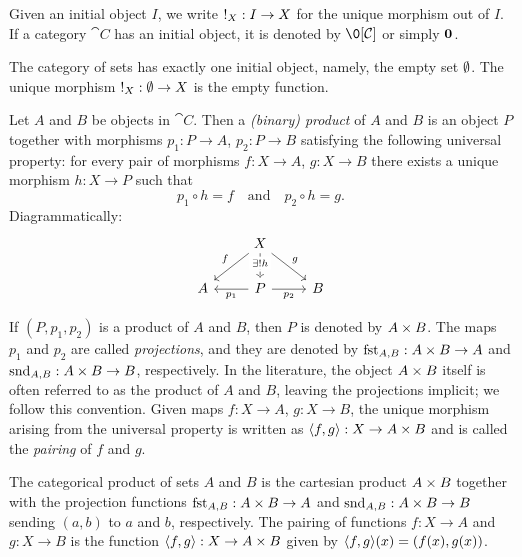 Given an initial object $I$, we write $\minit[X] : I \to X$ for the unique morphism out of $I$. If a category $\cat{C}$ has an initial object, it is denoted by $\0[\cat{C}]$ or simply $\mathbf{0}_{}$.

\begin{ex} \label{ex:set-initial-object}
The category of sets has exactly one initial object, namely, the empty set $\emptyset$. The unique morphism $\minit[X] : \nul \to X$ is the empty function.
\end{ex}

\begin{defn} \label{def:binary-products}
Let $A$ and $B$ be objects in $\cat{C}$. Then a \emph{(binary) product} of $A$ and $B$ is an object $P$ together with morphisms $p_1 : P \to A$, $p_2 : P \to B$ satisfying the following universal property: for every pair of morphisms $f : X \to A$, $g : X \to B$ there exists a unique morphism $h : X \to P$ such that 
\[ p_1 \circ h = f \quad\text{and}\quad p_2 \circ h = g. \]
Diagrammatically:
\[\begin{tikzcd}
	& X \\
	A & P & B
	\arrow["{p_1}", from=2-2, to=2-1]
	\arrow["{p_2}"', from=2-2, to=2-3]
	\arrow["f"', from=1-2, to=2-1]
	\arrow["g", from=1-2, to=2-3]
	\arrow["{\exists! h}"{description, pos=0.4}, dashed, from=1-2, to=2-2]
\end{tikzcd}\]
\end{defn}

If $(P, p_1, p_2)$ is a product of $A$ and $B$, then $P$ is denoted by $A \times B$. The maps $p_1$ and $p_2$ are called \emph{projections}, and they are denoted by $\mfst[A,B] : \cprod{A}{B} \to A$ and $\msnd[A,B] : \cprod{A}{B} \to B$, respectively. In the literature, the object $A \times B$ itself is often referred to as the product of $A$ and $B$, leaving the projections implicit; we follow this convention. Given maps $f : X \to A$, $g : X \to B$, the unique morphism arising from the universal property is written as $\langle f, g \rangle : X \to A \times B$ and is called the \emph{pairing} of $f$ and $g$.

\begin{ex} \label{ex:set-products}
The categorical product of sets $A$ and $B$ is the cartesian product $A \times B$ together with the projection functions $\mfst[A,B] : \cartprod{A}{B} \to A$ and $\msnd[A,B] : \cartprod{A}{B} \to B$ sending $(a,b)$ to $a$ and $b$, respectively. The pairing of functions $f : X \to A$ and $g : X \to B$ is the function $\langle f, g \rangle : X \to A \times B$ given by $\langle f, g \rangle(x) = (f(x), g(x))$.
\end{ex}

